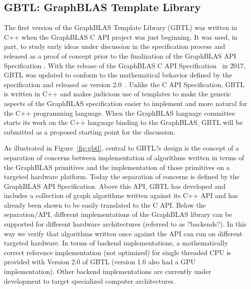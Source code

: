 \subsection{GBTL: GraphBLAS Template Library}
 
The first version of the GraphBLAS Template Library (GBTL) was written in C++ 
when the GraphBLAS C API project was just beginning.  It was used, in part, 
to study early ideas under discussion in the specification process and released as a proof of concept 
prior to the finalization of the GraphBLAS API Specification \cite{gbtl-cuda16, McMillan2016}. With the 
release of the GraphBLAS C API Specification~\cite{cspec} in 2017, GBTL was updated to conform to 
the mathematical behavior defined by the specification and released as version 2.0~\cite{gbtl-github}.  
Unlike the C API Specification, GBTL is written in C++ and makes judicious use of templates to 
make the generic aspects of the GraphBLAS specification easier to implement and 
more natural for the C++ programming language. When the GraphBLAS language committee
starts its work on the C++ language binding to the GraphBLAS, GBTL will be submitted as a 
proposed starting point for the discussion.

 
As illustrated in Figure~\ref{fig:gbtl}, central to GBTL?s design is the concept of a separation 
of concerns between implementation of algorithms written in terms of the GraphBLAS primitives 
and the implementation of those primitives on a targeted hardware platform.   Today the
 separation of concerns is defined by the GraphBLAS API Specification.  Above 
 this API, GBTL has developed and includes a collection of graph algorithms 
 written against its C++ API and has already been shown to be easily translated to the C API.  
 Below the separation/API, different implementations of the GraphBLAS library can be supported 
 for different hardware architectures (referred to as ?backends?).  In this way we verify that algorithms 
 written once against the API can run on different targeted hardware.  In terms of backend 
 implementations, a mathematically correct reference implementation (not optimized) for single 
 threaded CPU is provided with Version 2.0 of GBTL (version 1.0 also had a GPU implementation).  
 Other backend implementations are currently under development to target specialized computer architectures.

